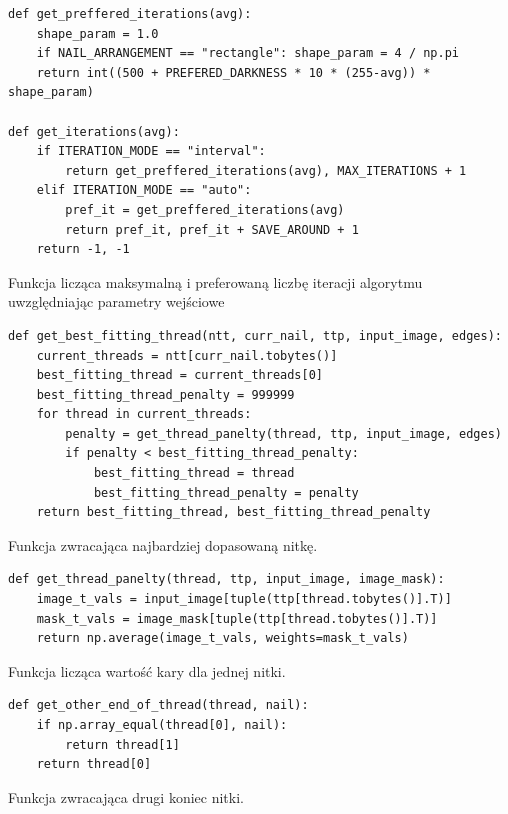         \begin{code}[H]
        \begin{verbatim}
def get_preffered_iterations(avg):
    shape_param = 1.0
    if NAIL_ARRANGEMENT == "rectangle": shape_param = 4 / np.pi
    return int((500 + PREFERED_DARKNESS * 10 * (255-avg)) * shape_param)

def get_iterations(avg):
    if ITERATION_MODE == "interval":
        return get_preffered_iterations(avg), MAX_ITERATIONS + 1
    elif ITERATION_MODE == "auto":
        pref_it = get_preffered_iterations(avg)
        return pref_it, pref_it + SAVE_AROUND + 1
    return -1, -1
        \end{verbatim}
        \caption{Funkcja licząca maksymalną i preferowaną liczbę iteracji algorytmu uwzględniając parametry wejściowe}
        \label{imp-art-algorithm-iterations-code}
        \end{code}
        
        \begin{code}[H]
        \begin{verbatim}
def get_best_fitting_thread(ntt, curr_nail, ttp, input_image, edges): 
    current_threads = ntt[curr_nail.tobytes()]
    best_fitting_thread = current_threads[0]
    best_fitting_thread_penalty = 999999
    for thread in current_threads:
        penalty = get_thread_panelty(thread, ttp, input_image, edges)
        if penalty < best_fitting_thread_penalty:
            best_fitting_thread = thread
            best_fitting_thread_penalty = penalty
    return best_fitting_thread, best_fitting_thread_penalty
        \end{verbatim}
        \caption{Funkcja zwracająca najbardziej dopasowaną nitkę.}
        \label{imp-art-algorithm-thread-select-code}
        \end{code}
        
        \begin{code}[H]
        \begin{verbatim}
def get_thread_panelty(thread, ttp, input_image, image_mask):
    image_t_vals = input_image[tuple(ttp[thread.tobytes()].T)] 
    mask_t_vals = image_mask[tuple(ttp[thread.tobytes()].T)] 
    return np.average(image_t_vals, weights=mask_t_vals)
        \end{verbatim}
        \caption{Funkcja licząca wartość kary dla jednej nitki.}
        \label{imp-art-algorithm-penalty-calc-code}
        \end{code}
        
        \begin{code}[H]
        \begin{verbatim}
def get_other_end_of_thread(thread, nail):
    if np.array_equal(thread[0], nail):
        return thread[1]
    return thread[0]
        \end{verbatim}
        \caption{Funkcja zwracająca drugi koniec nitki.}
        \label{imp-art-other-end-code}
        \end{code}
        
